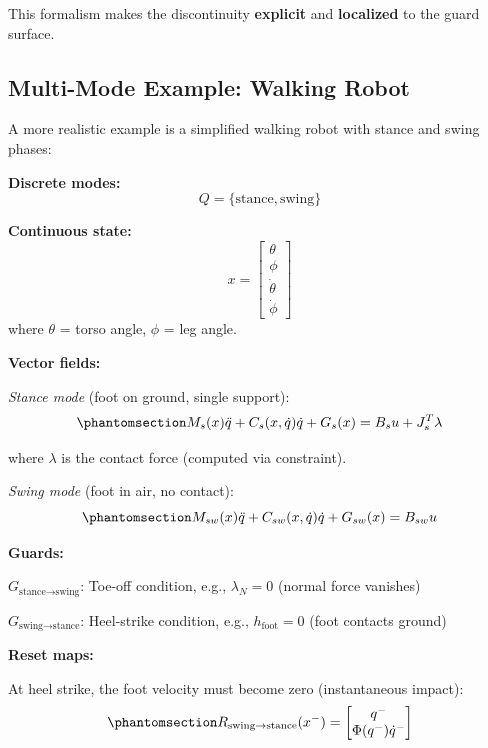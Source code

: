 \documentclass[
  letterpaper,
  DIV=11,
  numbers=noendperiod]{scrartcl}
\begin{document}
This formalism makes the discontinuity \textbf{explicit} and
\textbf{localized} to the guard surface.

\subsection{Multi-Mode Example: Walking
Robot}\label{multi-mode-example-walking-robot}

A more realistic example is a simplified walking robot with stance and
swing phases:

\textbf{Discrete modes:} \[
Q = \{\text{stance}, \text{swing}\}
\]

\textbf{Continuous state:} \[
x = \begin{bmatrix} \theta \\ \phi \\ \dot{\theta} \\ \dot{\phi} \end{bmatrix}
\] where \(\theta\) = torso angle, \(\phi\) = leg angle.

\textbf{Vector fields:}

\emph{Stance mode} (foot on ground, single support):
\begin{equation}\phantomsection\label{eq-stance-dynamics}{
M_s(x)\ddot{q} + C_s(x, \dot{q})\dot{q} + G_s(x) = B_s u + J_s^T \lambda
}\end{equation}

where \(\lambda\) is the contact force (computed via constraint).

\emph{Swing mode} (foot in air, no contact):
\begin{equation}\phantomsection\label{eq-swing-dynamics}{
M_{sw}(x)\ddot{q} + C_{sw}(x, \dot{q})\dot{q} + G_{sw}(x) = B_{sw} u
}\end{equation}

\textbf{Guards:}

\(G_{\text{stance} \to \text{swing}}\): Toe-off condition, e.g.,
\(\lambda_N = 0\) (normal force vanishes)

\(G_{\text{swing} \to \text{stance}}\): Heel-strike condition, e.g.,
\(h_{\text{foot}} = 0\) (foot contacts ground)

\textbf{Reset maps:}

At heel strike, the foot velocity must become zero (instantaneous
impact): \begin{equation}\phantomsection\label{eq-stance-reset}{
R_{\text{swing} \to \text{stance}}(x^-) = \begin{bmatrix} q^- \\ \Phi(q^-) \dot{q}^- \end{bmatrix}
}\end{equation}
\end{document}
